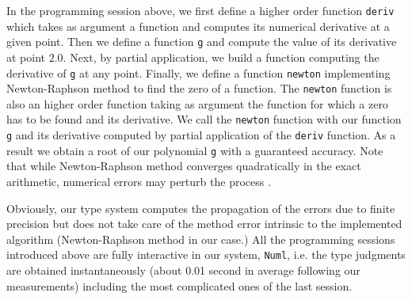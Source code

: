 In the programming session above, we first define a higher order function \texttt{deriv}
which takes as argument a function and computes its numerical derivative at a given point.
Then we define a function \texttt{g} and compute the value of its derivative at point $2.0$.
Next, by partial application, we build a function computing the derivative of \texttt{g} at any point.
Finally, we define a function \texttt{newton} implementing Newton-Raphson method to find the
zero of a function. The \texttt{newton} function is also an higher order function taking as
argument the function for which a zero has to be found and its derivative. We call the
\texttt{newton} function with our function \texttt{g} and its derivative computed by partial application of the
\texttt{deriv} function. As a result we obtain a root of our polynomial \texttt{g} with a
guaranteed accuracy. Note that while Newton-Raphson method converges quadratically in the exact arithmetic,
numerical errors may perturb the process \cite{DMC15b}.

Obviously, our type system computes the propagation of the errors due to finite precision
but does not take care of the method error intrinsic to the implemented algorithm (Newton-Raphson method
in our case.)
All the programming sessions introduced above are fully interactive in our system, \texttt{Numl},
i.e. the type judgments are obtained instantaneously (about 0.01 second in average following our measurements)
including the most complicated ones of the last session.

